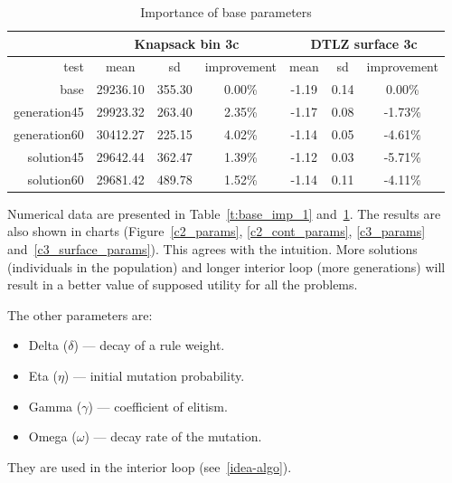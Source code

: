 \begin{table}
  \centering
  \begin{tabular}{r c c c c c c}
    & \multicolumn{3}{c}{Knapsack bin 3c} & \multicolumn{3}{c}{DTLZ surface 3c} \\
    \hline
    test & mean & sd & improvement & mean & sd & improvement \\
    \hline
    \hline
    base & 29236.10 & 355.30 & 0.00\% & -1.19 & 0.14 & 0.00\% \\
    generation45 & 29923.32 & 263.40 & 2.35\% & -1.17 & 0.08 & -1.73\% \\
    generation60 & 30412.27 & 225.15 & 4.02\% & -1.14 & 0.05 & -4.61\% \\
    solution45 & 29642.44 & 362.47 & 1.39\% & -1.12 & 0.03 & -5.71\% \\
    solution60 & 29681.42 & 489.78 & 1.52\% & -1.14 & 0.11 & -4.11\% \\
    \hline
  \end{tabular}
  \caption{Importance of base parameters}
  \label{t:base_imp_2}
\end{table}


Numerical data are presented in Table~\ref{t:base_imp_1}
and~\ref{t:base_imp_2}. The results are also shown in charts
(Figure~\ref{c2_params}, \ref{c2_cont_params}, \ref{c3_params}
and~\ref{c3_surface_params}). This agrees with the intuition. More solutions
(individuals in the population) and longer interior loop (more generations)
will result in a better value of supposed utility for all the problems.

The other parameters are:
\begin{itemize}
\item Delta ($\delta$) --- decay of a rule weight.
\item Eta ($\eta$) --- initial mutation probability.
\item Gamma ($\gamma$) --- coefficient of elitism.
\item Omega ($\omega$) --- decay rate of the mutation.
\end{itemize}

They are used in the interior loop (see~\ref{idea-algo}).

